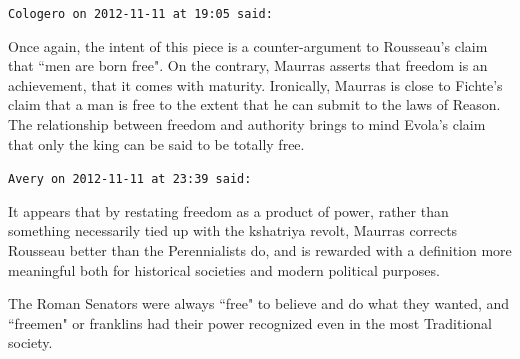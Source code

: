 \begin{footnotesize}\begin{sffamily}



\texttt{Cologero on 2012-11-11 at 19:05 said: }

Once again, the intent of this piece is a counter-argument to Rousseau's claim that ``men are born free". On the contrary, Maurras asserts that freedom is an achievement, that it comes with maturity. Ironically, Maurras is close to Fichte's claim that a man is free to the extent that he can submit to the laws of Reason. The relationship between freedom and authority brings to mind Evola's claim that only the king can be said to be totally free.


\hfill

\texttt{Avery on 2012-11-11 at 23:39 said: }

It appears that by restating freedom as a product of power, rather than something necessarily tied up with the kshatriya revolt, Maurras corrects Rousseau better than the Perennialists do, and is rewarded with a definition more meaningful both for historical societies and modern political purposes.

The Roman Senators were always ``free" to believe and do what they wanted, and ``freemen" or franklins had their power recognized even in the most Traditional society.


\end{sffamily}\end{footnotesize}
